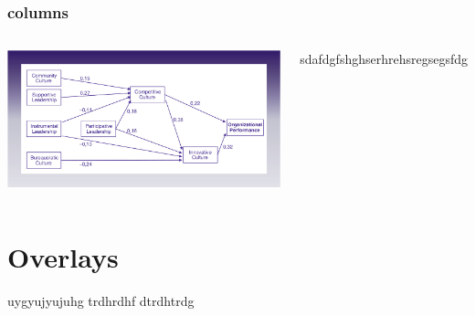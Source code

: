 \begin{frame}
\frametitle{columns}

\begin{columns}

\includegraphics[scale=.1]{"./image/OB/Ogbonna & Harris.jpg"}


sdafdgfshghserhrehsregsegsfdg

\end{columns}

\end{frame}
\section{Overlays}

\begin{frame}
uygyujyujuhg
trdhrdhf
dtrdhtrdg


\end{frame}



